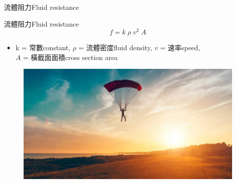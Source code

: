 \documentclass[beamer=true]{standalone}
\begin{document}
\begin{frame}{流體阻力Fluid resistance}
    \begin{exampleblock}
        {流體阻力Fluid resistance}
        \begin{equation}
            f=k \;\rho\; v^2\; A
        \end{equation}
    \end{exampleblock}
    \begin{itemize}
        \item k = 常數constant, $\rho$ = 流體密度fluid density, $v$ = 速率speed, \\$A$ = 橫截面面積cross section area

    \end{itemize}
    \bigskip
    \begin{figure}[h!]
        \centering
        \includegraphics[width=.4\textwidth]{assets/31e14542.png}
    \end{figure}
\end{frame}
\end{document}
